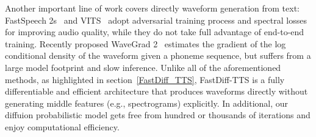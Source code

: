 Another important line of work covers directly waveform generation from text: FastSpeech 2s~\cite{ren2020fastspeech} and VITS~\cite{kim2021conditional} adopt adversarial training process and spectral losses for improving audio quality, while they do not take full advantage of end-to-end training. Recently proposed WaveGrad 2~\cite{chen2021wavegrad} estimates the gradient of the log conditional density of the waveform given a phoneme sequence, but suffers from a large model footprint and slow inference. Unlike all of the aforementioned methods, as highlighted in section~\ref{FastDiff_TTS}, FastDiff-TTS is a fully differentiable and efficient architecture that produces waveforms directly without generating middle features (e.g., spectrograms) explicitly. In additional, our diffuion probabilistic model gets free from hundred or thousands of iterations and enjoy computational efficiency.
